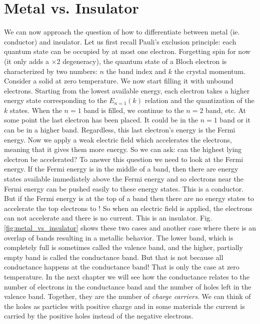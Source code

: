 \documentclass{Textbook}
\begin{document}
\section{Metal vs. Insulator}
We can now approach the question of how to differentiate between metal (ie. conductor) and insulator. Let us first recall Pauli's exclusion principle: each quantum state can be occupied by at most one electron. Forgetting spin for now (it only adds a $\times 2$ degeneracy), the quantum state of a Bloch electron is characterized by two numbers: $n$ the band index and $k$ the crystal momentum.\nl
Consider a solid at zero temperature. We now start filling it with unbound electrons. Starting from the lowest available energy, each electron takes a higher energy state corresponding to the $E_{n=1}(k)$ relation and the quantization of the $k$ states. When the $n=1$ band is filled, we continue to the $n=2$ band, etc. At some point the last electron has been placed. It could be in the $n=1$ band or it can be in a higher band. Regardless, this last electron's energy is the Fermi energy. Now we apply a weak electric field which accelerates the electrons, meaning that it gives them more energy. So we can ask: can the highest lying electron be accelerated? To answer this question we need to look at the Fermi energy. \nl
If the Fermi energy is in the middle of a band, then there are energy states available immediately above the Fermi energy and so electrons near the Fermi energy can be pushed easily to these energy states. This is a conductor.\nl
But if the Fermi energy is at the top of a band then there are no energy states to accelerate the top electrons to ! So when an electric field is applied, the electrons can not accelerate and there is no current. This is an insulator. \nl
Fig. \ref{fig:metal_vs_insulator} shows these two cases and another case where there is an overlap of bands resulting in a metallic behavior.\nl
The lower band, which is completely full is sometimes called the valence band, and the higher, partially empty band is called the conductance band. But that is not because all conductance happens at the conductance band! That is only the case at zero temperature. In the next chapter we will see how the conductance relates to the number of electrons in the conductance band and the number of holes left in the valence band. Together, they are the number of \emph{charge carriers}. We can think of the holes as particles with positive charge and in some materials the current is carried by the positive holes instead of the negative electrons.\nl
\end{document}
